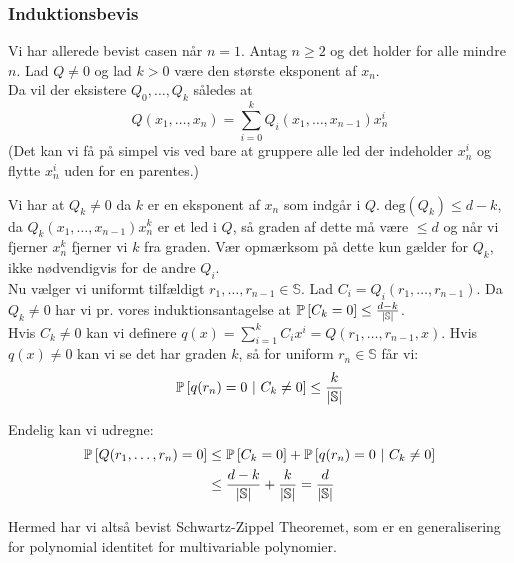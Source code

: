 \subsubsection{Induktionsbevis}
Vi har allerede bevist casen når $n = 1$. Antag $n \geq 2$ og det holder for alle mindre $n$. Lad $Q \neq 0$ og lad $k > 0$ være den største eksponent af $x_n$.\\

Da vil der eksistere $Q_0, \dots, Q_k$ således at
$$
  Q(x_1, \dots, x_n) = \sum_{i=0}^k Q_i (x_1, \dots, x_{n-1}) x_n^i
$$
(Det kan vi få på simpel vis ved bare at gruppere alle led der indeholder $x_n^i$ og flytte $x_n^i$ uden for en parentes.)

Vi har at $Q_k \neq 0$ da $k$ er en eksponent af $x_n$ som indgår i $Q$. $\text{deg}(Q_k) \leq d - k$, da $Q_k (x_1, \dots, x_{n-1})x_n^k$ er et led i $Q$, så graden af dette må være $\leq d$ og når vi fjerner $x_n^k$ fjerner vi $k$ fra graden. Vær opmærksom på dette kun gælder for $Q_k$, ikke nødvendigvis for de andre $Q_i$.\\


Nu vælger vi uniformt tilfældigt $r_1, \dots, r_{n-1} \in \mathbb S$. Lad $C_i = Q_i(r_1, \dots, r_{n-1})$. Da $Q_k \neq 0$ har vi pr. vores induktionsantagelse at $\P{C_k = 0} \leq \frac{d - k}{|\mathbb S|}$.\\

Hvis $C_k \neq 0$ kan vi definere $q(x) = \sum_{i=1}^k C_i x^i = Q(r_1, \dots, r_{n-1}, x)$. Hvis $q(x) \neq 0$ kan vi se det har graden $k$, så for uniform $r_n \in \mathbb S$ får vi:
$$
\P{q(r_n) = 0 \ | C_k \neq 0} \leq \frac{k}{|\mathbb S|}
$$

Endelig kan vi udregne:
\begin{align}
  \P{Q(r_1, \dots, r_n) = 0}
  &\leq \P{C_k = 0} + \P{q(r_n) = 0 | C_k \neq 0}\\
  &\leq \frac{d - k}{|\mathbb S|} + \frac{k}{|\mathbb S|} = \frac{d}{|\mathbb S|}
\end{align}

Hermed har vi altså bevist Schwartz-Zippel Theoremet, som er en generalisering for polynomial identitet for multivariable polynomier.



